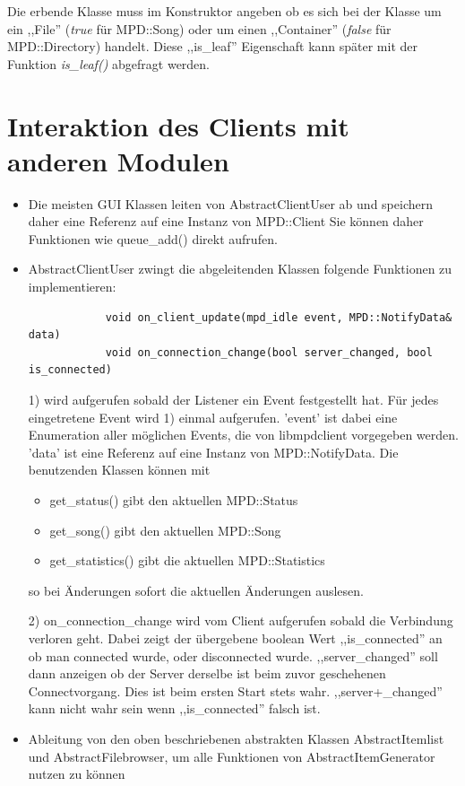 Die erbende Klasse muss im Konstruktor angeben ob es sich bei der Klasse um ein ,,File'' (\emph{true} für MPD::Song) oder um einen ,,Container'' (\emph{false} für MPD::Directory) handelt.
Diese ,,is\_leaf'' Eigenschaft kann später mit der Funktion \emph{is\_leaf()} abgefragt werden.




\section{Interaktion des Clients mit anderen Modulen}
\begin{itemize}
    \item Die meisten GUI Klassen leiten von AbstractClientUser ab und speichern daher eine Referenz auf eine Instanz von MPD::Client
        Sie können daher Funktionen wie queue\_add() direkt aufrufen.
    \item AbstractClientUser zwingt die abgeleitenden Klassen folgende Funktionen zu implementieren: 
        \begin{verbatim} 
            void on_client_update(mpd_idle event, MPD::NotifyData& data)
            void on_connection_change(bool server_changed, bool is_connected)
        \end{verbatim}

        1) wird aufgerufen sobald der Listener ein Event festgestellt hat. Für jedes eingetretene Event wird 1)
        einmal aufgerufen. 'event' ist dabei eine Enumeration aller möglichen Events, die von libmpdclient 
        vorgegeben werden. %
        'data' ist eine Referenz auf eine Instanz von MPD::NotifyData. Die benutzenden Klassen können mit
        \begin{itemize} 
            \item get\_status() gibt den aktuellen MPD::Status
            \item get\_song() gibt den aktuellen MPD::Song
            \item get\_statistics() gibt die aktuellen MPD::Statistics
        \end{itemize} 
        so bei Änderungen sofort die aktuellen Änderungen auslesen.



        2) on\_connection\_change wird vom Client aufgerufen sobald die Verbindung verloren geht.
        Dabei zeigt der übergebene boolean Wert ,,is\_connected'' an ob man connected wurde, oder disconnected wurde.
        ,,server\_changed'' soll dann anzeigen ob der Server derselbe ist beim zuvor geschehenen Connectvorgang.
        Dies ist beim ersten Start stets wahr. ,,server+\_changed'' kann nicht wahr sein wenn ,,is\_connected'' falsch ist.
    \item Ableitung von den oben beschriebenen abstrakten Klassen AbstractItemlist und AbstractFilebrowser, um alle Funktionen von AbstractItemGenerator nutzen zu können  
\end{itemize}

